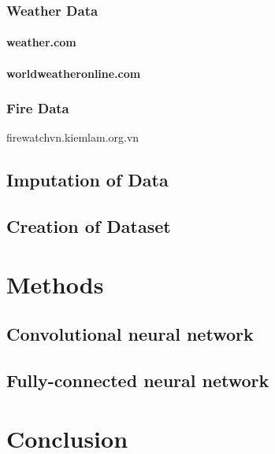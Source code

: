 \documentclass{article}
\begin{document}
\subsubsection{Weather Data}
\paragraph{weather.com}

\paragraph{worldweatheronline.com}

\subsubsection{Fire Data}
firewatchvn.kiemlam.org.vn

\subsection{Imputation of Data}
\subsection{Creation of Dataset}



\section{Methods}

\subsection{Convolutional neural network}
\subsection{Fully-connected neural network}



\section{Conclusion}






\end{document}
